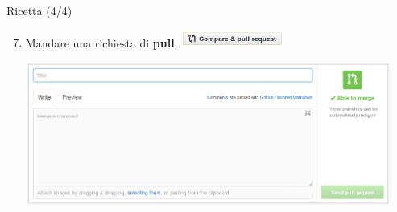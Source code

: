 \documentclass{beamer}
\begin{document}
\begin{frame}{\centerline{Ricetta (4/4)}}
  \begin{enumerate}
    \setcounter{enumi}{6}
  \item Mandare una richiesta di \textbf{pull}.
    \includegraphics[height=0.55cm]{A2023.LavoroCondiviso/github-compare-and-pull-request}
    \begin{center}
      \hbox{\hspace{-0cm}\includegraphics[width=12cm]{A2023.LavoroCondiviso/github-pull-request}}
    \end{center}
  \end{enumerate}
\end{frame}
\end{document}
